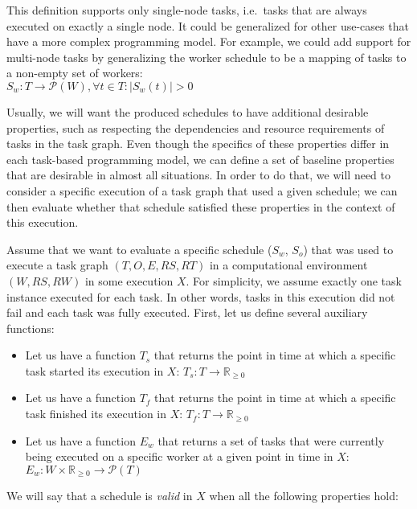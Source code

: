 This definition supports only single-node tasks, i.e.\ tasks that are always executed on exactly
a single node. It could be generalized for other use-cases that have a more complex programming
model. For example, we could add support for multi-node tasks by generalizing the worker schedule
to be a mapping of tasks to a non-empty set of workers: \\
$S_w\colon T \rightarrow \mathcal{P}(W), \forall t\in{}T\colon |S_w(t)| > 0$

Usually, we will want the produced schedules to have additional desirable properties, such as
respecting the dependencies and resource requirements of tasks in the task graph. Even though the
specifics of these properties differ in each task-based programming model, we can define a set of
baseline properties that are desirable in almost all situations. In order to do that, we will need
to consider a specific execution of a task graph that used a given schedule; we can then evaluate
whether that schedule satisfied these properties in the context of this execution.

Assume that we want to evaluate a specific schedule ($S_w$, $S_o$) that was used to execute a
task graph $(T, O, E, RS, RT)$ in a computational environment $(W, RS, RW)$ in some execution $X$. For
simplicity, we assume exactly one task instance executed for each task. In other words,
tasks in this execution did not fail and each task was fully executed.
First, let us define several auxiliary functions:

\newcommand{\timedomain}{\mathbb{R}_{\geq{}0}}

\begin{itemize}
	\item Let us have a function $T_s$ that returns the point in time at which a specific
	      task started its execution in $X$: $T_s\colon T \rightarrow \timedomain$
	\item Let us have a function $T_f$ that returns the point in time at which a specific
	      task finished its execution in $X$: $T_f\colon T \rightarrow \timedomain$
	\item Let us have a function $E_w$ that returns a set of tasks that were currently being
	      executed on a specific worker at a given point in time in $X$:
	      $E_w\colon W \times \timedomain \rightarrow \mathcal{P}(T)$
\end{itemize}

We will say that a schedule is \emph{valid} in $X$ when all the following properties hold:

